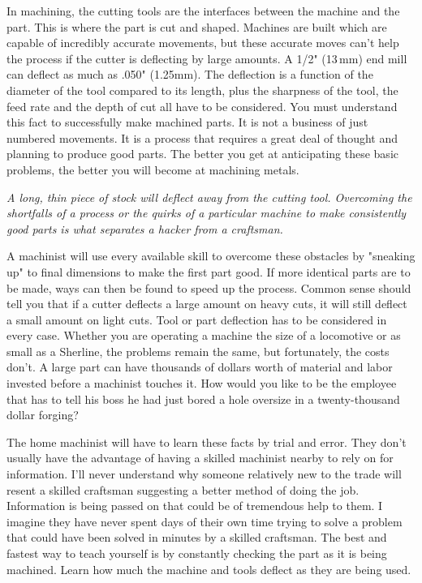 \secdown

\secdown


In machining, the cutting tools are the interfaces between the machine and the
part. This is where the part is cut and shaped. Machines are built which are
capable of incredibly accurate movements, but these accurate moves can't help
the process if the cutter is deflecting by large amounts. A 1/2" (13\,mm) end
mill can deflect as much as .050" (1.25mm). The deflection is a function of the
diameter of the tool compared to its length, plus the sharpness of the tool, the
feed rate and the depth of cut all have to be considered. You must understand
this fact to successfully make machined parts. It is not a business of just
numbered movements. It is a process that requires a great deal of thought and
planning to produce good parts. The better you get at anticipating these basic
problems, the better you will become at machining metals.

\bigskip
\textit{A long, thin piece of stock will deflect away from the cutting tool.
Overcoming the shortfalls of a process or the quirks of a particular machine to
make consistently good parts is what separates a hacker from a craftsman.}
\bigskip

A machinist will use every available skill to overcome these obstacles by
"sneaking up" to final dimensions to make the first part good. If more identical
parts are to be made, ways can then be found to speed up the process. Common
sense should tell you that if a cutter deflects a large amount on heavy cuts, it
will still deflect a small amount on light cuts. Tool or part deflection has to
be considered in every case. Whether you are operating a machine the size of a
locomotive or as small as a Sherline, the problems remain the same, but
fortunately, the costs don't. A large part can have thousands of dollars worth
of material and labor invested before a machinist touches it. How would you like
to be the employee that has to tell his boss he had just bored a hole oversize
in a twenty-thousand dollar forging?

The home machinist will have to learn these facts by trial and error. They don't
usually have the advantage of having a skilled machinist nearby to rely on for
information. I'll never understand why someone relatively new to the trade will
resent a skilled craftsman suggesting a better method of doing the job.
Information is being passed on that could be of tremendous help to them. I
imagine they have never spent days of their own time trying to solve a problem
that could have been solved in minutes by a skilled craftsman. The best and
fastest way to teach yourself is by constantly checking the part as it is being
machined. Learn how much the machine and tools deflect as they are being used.

